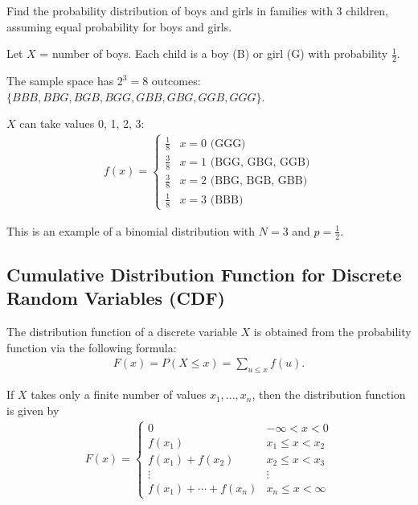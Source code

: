 \begin{ejemplo}
	\label{exmp:2.6.4}
	Find the probability distribution of boys and girls in families with 3 children, assuming equal probability for boys and girls.
\end{ejemplo}

\begin{solucion}
	Let $X$ = number of boys. Each child is a boy (B) or girl (G) with probability $\frac{1}{2}$.
	
	The sample space has $2^3 = 8$ outcomes: $\{BBB, BBG, BGB, BGG, GBB, GBG, GGB, GGG\}$.
	
	$X$ can take values 0, 1, 2, 3:
	\begin{align}
		f(x) = \begin{cases}
			\frac{1}{8} & x = 0 \text{ (GGG)} \\
			\frac{3}{8} & x = 1 \text{ (BGG, GBG, GGB)} \\
			\frac{3}{8} & x = 2 \text{ (BBG, BGB, GBB)} \\
			\frac{1}{8} & x = 3 \text{ (BBB)}
		\end{cases}
	\end{align}
	
	This is an example of a binomial distribution with $N=3$ and $p=\frac{1}{2}$.
\end{solucion}

\subsection{Cumulative Distribution Function for Discrete Random Variables (CDF)}

The distribution function of a discrete variable $X$ is obtained from the probability function via the following formula:
\begin{align}
	\label{eq:2.6.2}
	F(x) = P(X\leq x) = \sum_{u \leq x} f(u).
\end{align}

If $X$ takes only a finite number of values $x_{1},...,x_{n}$, then the distribution function is given by
\begin{align}
	\label{eq:2.6.3}
	F(x)=
	\begin{cases}
		0 & -\infty < x < 0 \\
		f(x_{1}) & x_{1} \leq x < x_{2} \\
		f(x_{1})+f(x_{2}) & x_{2} \leq x < x_{3} \\
		\vdots & \vdots \\
		f(x_{1})+\cdots+f(x_{n}) & x_{n} \leq x < \infty
	\end{cases}
\end{align}

